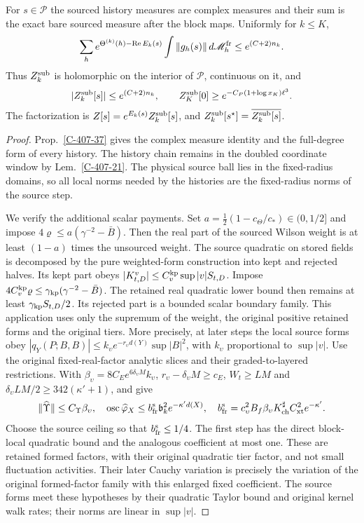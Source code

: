 \documentclass[11pt,letterpaper,reqno]{amsart}
\makeatletter
\theoremstyle{definition}
\newcommand{\ms@minorstart}{%
  \pushQED{\qed}\renewcommand{\qedsymbol}{$\blacksquare$}}
\newenvironment{proposition}[1][]{\ms@minorstart\ms@proposition[#1]}
  {\popQED\endms@proposition}
\theoremstyle{remark}
\makeatother
\begin{document}
\begin{proposition}[All histories at the sources]\label{C-407-22}
For $s\in\mathcal P$ the sourced history measures are
complex measures and their sum is the exact bare sourced
measure after the block maps. Uniformly for $k\le K$,
\[
 \sum_h e^{\Theta^{(k)}(h)-\operatorname{Re}E_k(s)}
       \int\|g_h(s)\|\,d\mathscr M_h^{\rm fr}
 \le e^{(C+2)n_k}.
\]
Thus $Z_k^{\rm sub}$ is holomorphic on the interior of
$\mathcal P$, continuous on it, and
\[
 |Z_k^{\rm sub}[s]|\le e^{(C+2)n_k},\qquad
 Z_K^{\rm sub}[0]\ge e^{-C_P(1+\log x_K)\ell^3}.
\]
The factorization is $Z[s]=e^{E_k(s)}Z_k^{\rm sub}[s]$,
and $Z_k^{\rm sub}[s^\star]=\overline{Z_k^{\rm sub}[s]}$.
\end{proposition}
\begin{proof}
Prop.~\ref{C-407-37} gives the complex measure identity
and the full-degree form of every history. The history chain
remains in the
doubled coordinate window by Lem.~\ref{C-407-21}.
The physical source ball lies in the fixed-radius
domains, so all local norms needed by the histories
are the fixed-radius norms of the source step.

We verify the additional scalar payments. Set
$a=\frac12(1-c_\Theta/c_*)\in(0,1/2]$ and impose
$4\varrho\le a(\gamma^{-2}-\bar B)$.
Then the real part of the sourced Wilson weight is at
least $(1-a)$ times the unsourced weight.
The source quadratic on stored fields is decomposed by
the pure weighted-form construction into kept
and rejected halves. Its kept part obeys
$|K_{t,D}^v|\le C_v^{\rm kp}\sup|v|S_{t,D}$.
Impose
$4C_v^{\rm kp}\varrho\le\gamma_{\rm kp}(\gamma^{-2}-\bar B)$.
The retained real quadratic lower bound then remains
at least $\gamma_{\rm kp}S_{t,D}/2$. Its rejected part
is a bounded scalar boundary family. This application
uses only the supremum of the weight, the original
positive retained forms and the original tiers.
More precisely, at later steps the local source forms
obey $|q_Y(P;B,B)|\le k_\upsilon e^{-r_\upsilon d(Y)}
\sup|B|^2$, with $k_\upsilon$ proportional to $\sup|v|$.
Use the original fixed-real-factor analytic slices and
their graded-to-layered restrictions. With
$\beta_\upsilon=8C_Ee^{6\delta_\upsilon M}k_\upsilon$,
$r_\upsilon-\delta_\upsilon M\ge c_E$,
$W_t\ge LM$ and
$\delta_\upsilon LM/2\ge342(\kappa'+1)$,
\cite[Prop.~5.36]{YMM1} and \cite[Prop.~5.37]{YMM1} give
\[
 \|\widehat\Upsilon\|\le C_\Upsilon\beta_\upsilon,
 \quad \operatorname{osc}\widehat\varphi_X
 \le b_{\rm fr}^{\rm s}\mathfrak b_k^2e^{-\kappa'd(X)},
 \quad b_{\rm fr}^{\rm s}
 =c_\upsilon^2B_f\beta_\upsilon K_{\rm ch}^\sharp
 C_{\rm xt}^2e^{-\kappa'}.
\]
Choose the source ceiling so that $b_{\rm fr}^{\rm s}\le1/4$.
The first step has the direct block-local quadratic bound
and the analogous coefficient at most one. These are
retained formed factors, with their original quadratic
tier factor, and not small fluctuation activities.
Their later Cauchy variation is precisely the variation
of the original formed-factor family with this enlarged
fixed coefficient. The source forms meet these hypotheses
by their quadratic Taylor bound and original kernel walk
rates; their norms are linear in $\sup|v|$.


\end{proof}
\end{document}
